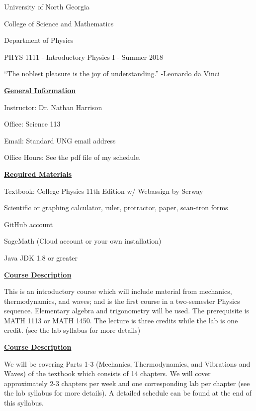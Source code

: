\documentclass[12pt]{article}
\begin{document}
{\centering
\large University of North Georgia \par
\large College of Science and Mathematics \par
\large Department of Physics \par
\large PHYS 1111 - Introductory Physics I - Summer 2018 \par
}
\hfill \break \vspace{-4mm}

``The noblest pleasure is the joy of understanding.'' -Leonardo da Vinci
\hfill \break

\underline{\textbf{General Information}} \par
Instructor: Dr. Nathan Harrison \par
Office: Science 113 \par
Email: Standard UNG email address \par
Office Hours: See the pdf file of my schedule.
\hfill \break

\underline{\textbf{Required Materials}} \par
Textbook: College Physics 11th Edition w/ Webassign by Serway \par
Scientific or graphing calculator, ruler, protractor, paper, scan-tron forms \par
GitHub account \par
SageMath (Cloud account or your own installation) \par
Java JDK 1.8 or greater
\hfill \break

\underline{\textbf{Course Description}} \par
This is an introductory course which will include material from mechanics, thermodynamics, and waves;
and is the first course in a two-semester Physics sequence.
Elementary algebra and trigonometry will be used.
The prerequisite is MATH 1113 or MATH 1450.
The lecture is three credits while the lab is one credit. (see the lab syllabus for more details)
\hfill \break

\underline{\textbf{Course Description}} \par
We will be covering Parts 1-3 (Mechanics, Thermodynamics, and Vibrations and Waves) of the textbook which consists of 14 chapters.
We will cover approximately 2-3 chapters per week and one corresponding lab per chapter (see the lab syllabus for more details). A detailed schedule can be found at the end of this syllabus.
\hfill \break
\end{document}
